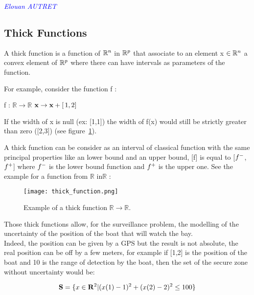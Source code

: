 \vspace{0.5 cm}
\textcolor{blue} {\textit{Elouan AUTRET}}
\vspace{0.3 cm}
\subsection{Thick Functions}

A thick function is a function of $\mathbb{R^{\textnormal{\ensuremath{n}}}}$ in $\mathbb{R^{\textnormal{\ensuremath{p}}}}$ that associate to an element x $\in \mathbb{R^{\textnormal{\ensuremath{n}}}}$ a convex element of $\mathbb{R^{\textnormal{\ensuremath{p}}}}$ where there can have intervals as parameters of the function.

For example, consider the function f :
\begin{algorithmic}[H]
\STATE f :  $\mathbb{R} \rightarrow \mathbb{R} $
\STATE $\mathbf{x} \rightarrow \mathbf{x}+ \mathbb{[ \,\textnormal{1},\textnormal{2}] \,}$
\end{algorithmic}

If the width of x is null (ex: [1,1]) the width of f(x) would still be strictly greater than zero ([2,3]) (see figure~\ref{fig:thickFunction}).

A thick function can be consider as an interval of classical function with the same principal properties like an lower bound and an upper bound, [f] is equal to [$f^{\textnormal{\ensuremath{-}}}$,$f^{\textnormal{\ensuremath{+}}}$]  where $f^{\textnormal{\ensuremath{-}}}$ is the lower bound function and $f^{\textnormal{\ensuremath{+}}}$ is the upper one. See the example for  a function from $\mathbb{R} $ in$ \mathbb{R} $ :

\begin{figure}[H]
\centering
    \texttt{[image: thick\_function.png]}
    \caption{Example of a thick function  $\mathbb{R} \rightarrow \mathbb{R} $.}
    \label{fig:thickFunction}
\end{figure}

Those thick functions allow, for the surveillance problem, the modelling of the uncertainty of
the position of the boat that will watch the bay.\\
Indeed, the position can be given by a GPS but the result is not absolute, the real position can be off by a few meters, for example if [1,2] is the position of the boat and 10 is the range of detection by the boat, then the set of the secure zone without uncertainty would be:

\begin{equation}
 \mathbf{S} = \{ x \in \mathbf{R}^{\textnormal{\ensuremath{2}}} | (x(1)-1)^{\textnormal{\ensuremath{2}}} + (x(2)-2)^{\textnormal{\ensuremath{2}}} \leq 100 \}  \label{eqDIST}
\end{equation}

